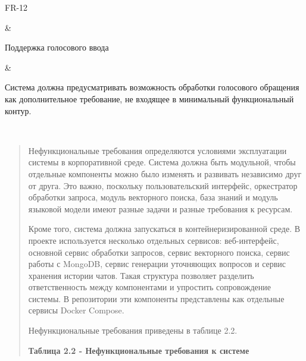 \begin{longtable}[]
\begin{minipage}[b]{\linewidth}\raggedright
FR-12
\end{minipage} & \begin{minipage}[b]{\linewidth}\raggedright
Поддержка голосового ввода
\end{minipage} & \begin{minipage}[b]{\linewidth}\raggedright
Система должна предусматривать возможность обработки голосового
обращения как дополнительное требование, не входящее в минимальный
функциональный контур.
\end{minipage} \\
\midrule\noalign{}
\endhead
\bottomrule\noalign{}
\endlastfoot
\end{longtable}

\begin{quote}
Нефункциональные требования определяются условиями эксплуатации системы
в корпоративной среде. Система должна быть модульной, чтобы отдельные
компоненты можно было изменять и развивать независимо друг от друга. Это
важно, поскольку пользовательский интерфейс, оркестратор обработки
запроса, модуль векторного поиска, база знаний и модуль языковой модели
имеют разные задачи и разные требования к ресурсам.

Кроме того, система должна запускаться в контейнеризированной среде. В
проекте используется несколько отдельных сервисов: веб-интерфейс,
основной сервис обработки запросов, сервис векторного поиска, сервис
работы с MongoDB, сервис генерации уточняющих вопросов и сервис хранения
истории чатов. Такая структура позволяет разделить ответственность между
компонентами и упростить сопровождение системы. В репозитории эти
компоненты представлены как отдельные сервисы Docker Compose.

Нефункциональные требования приведены в таблице 2.2.

\textbf{Таблица 2.2 - Нефункциональные требования к системе}
\end{quote}

